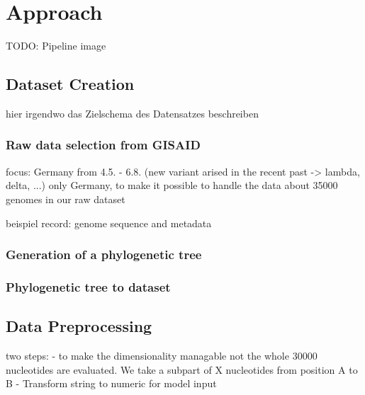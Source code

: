 \section{Approach} 
\label{approach}

TODO: Pipeline image

\subsection{Dataset Creation}  \label{ch:approachA}

hier irgendwo das Zielschema des Datensatzes beschreiben


\subsubsection{Raw data selection from GISAID}
\label{ch:approachAa}

focus: Germany from 4.5. - 6.8. (new variant arised in the recent past -> lambda, delta, ...)
only Germany, to make it possible to handle the data
about 35000 genomes in our raw dataset

beispiel record: genome sequence and metadata


\subsubsection{Generation of a phylogenetic tree}
\label{ch:approachAb}


\subsubsection{Phylogenetic tree to dataset}
\label{ch:approachAc}


\subsection{Data Preprocessing}  \label{ch:approachB}

two steps:
- to make the dimensionality managable not the whole 30000 nucleotides are evaluated. We take a subpart of X nucleotides from position A to B
- Transform string to numeric for model input


